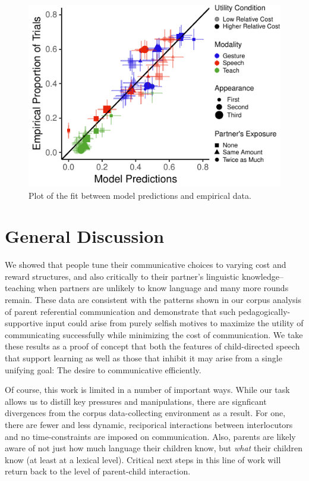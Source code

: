 \documentclass[10pt, letterpaper]{article}
\newenvironment{CodeChunk}{}{}
\begin{document}
\begin{CodeChunk}
\begin{figure}[H]

{\centering \includegraphics{figs/model_fit-1} 

}

\caption[Plot of the fit between model predictions and empirical data]{Plot of the fit between model predictions and empirical data.}\label{fig:model_fit}
\end{figure}
\end{CodeChunk}

\section{General Discussion}\label{general-discussion}

We showed that people tune their communicative choices to varying cost
and reward structures, and also critically to their partner's linguistic
knowledge--teaching when partners are unlikely to know language and many
more rounds remain. These data are consistent with the patterns shown in
our corpus analysis of parent referential communication and demonstrate
that such pedagogically-supportive input could arise from purely selfish
motives to maximize the utility of communicating successfully while
minimizing the cost of communication. We take these results as a proof
of concept that both the features of child-directed speech that support
learning as well as those that inhibit it may arise from a single
unifying goal: The desire to communicative efficiently.

Of course, this work is limited in a number of important ways. While our
task allows us to distill key pressures and manipulations, there are
signficant divergences from the corpus data-collecting environment as a
result. For one, there are fewer and less dynamic, reciporical
interactions between interlocutors and no time-constraints are imposed
on communication. Also, parents are likely aware of not just how much
language their children know, but \emph{what} their children know (at
least at a lexical level). Critical next steps in this line of work will
return back to the level of parent-child interaction.
\end{document}
